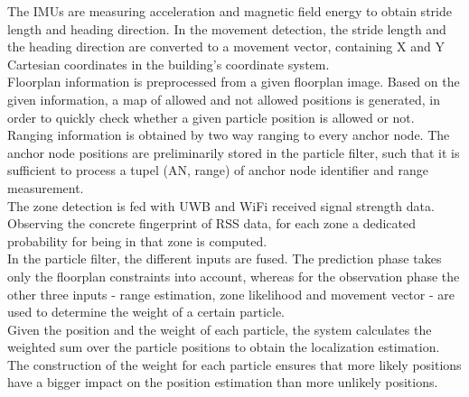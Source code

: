 \noindent\hspace*{5mm}%
The IMUs are measuring acceleration and magnetic field energy to obtain stride length and heading direction. In the movement detection, the stride length and the heading direction are converted to a movement vector, containing X and Y Cartesian coordinates in the building's coordinate system.\\
\noindent\hspace*{5mm}%
Floorplan information is preprocessed from a given floorplan image. Based on the given information, a map of allowed and not allowed positions is generated, in order to quickly check whether a given particle position is allowed or not.\\
\noindent\hspace*{5mm}%
Ranging information is obtained by two way ranging to every anchor node. The anchor node positions are preliminarily stored in the particle filter, such that it is sufficient to process a tupel (AN, range) of anchor node identifier and range measurement.\\
\noindent\hspace*{5mm}%
The zone detection is fed with UWB and WiFi received signal strength data. Observing the concrete fingerprint of RSS data, for each zone a dedicated probability for being in that zone is computed.\\
\noindent\hspace*{5mm}%
In the particle filter, the different inputs are fused. The prediction phase takes only the floorplan constraints into account, whereas for the observation phase the other three inputs - range estimation, zone likelihood and movement vector - are used to determine the weight of a certain particle.\\
\noindent\hspace*{5mm}%
Given the position and the weight of each particle, the system calculates the weighted sum over the particle positions to obtain the localization estimation. The construction of the weight for each particle ensures that more likely positions have a bigger impact on the position estimation than more unlikely positions.